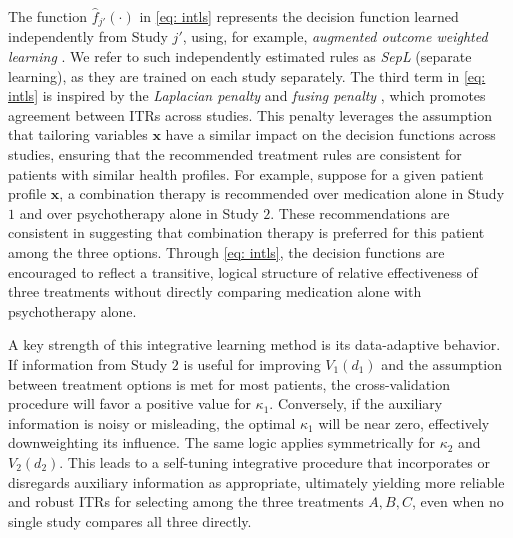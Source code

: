 \documentclass[12pt]{article}
\begin{document}
The function $\widehat{f}_{j'}(\cdot)$ in \eqref{eq: intls} represents the decision function learned independently from Study $j'$, using, for example, {\it augmented outcome weighted learning} \citep{liu2018augmented}. We refer to such independently estimated rules as {\it SepL} (separate learning), as they are trained on each study separately. The third term in \eqref{eq: intls} is inspired by the {\it Laplacian penalty} \citep{huang2011sparse} and {\it fusing penalty} \citep{gao2024fusing}, which promotes agreement between ITRs across studies. This penalty leverages the assumption that tailoring variables $\boldsymbol {x} $ have a similar impact on the decision functions across studies, ensuring that the recommended treatment rules are consistent for patients with similar health profiles. For example, suppose for a given patient profile $\boldsymbol x$, a combination therapy is recommended over medication alone in Study $1$ and over psychotherapy alone in Study $2$. These recommendations are consistent in suggesting that combination therapy is preferred for this patient among the three options. Through \eqref{eq: intls}, the decision functions are encouraged to reflect a transitive, logical structure of relative effectiveness of three treatments without directly comparing medication alone with psychotherapy alone.

A key strength of this integrative learning method is its data-adaptive behavior. If information from Study $2$ is useful for improving $V_1(d_1)$ and the assumption between treatment options is met for most patients, the cross-validation procedure will favor a positive value for $\kappa_1$. Conversely, if the auxiliary information is noisy or misleading, the optimal $\kappa_1$ will be near zero, effectively downweighting its influence. The same logic applies symmetrically for $\kappa_2$ and $V_2(d_2)$. This leads to a self-tuning integrative procedure that incorporates or disregards auxiliary information as appropriate, ultimately yielding more reliable and robust ITRs for selecting among the three treatments $A, B, C$, even when no single study compares all three directly.
\end{document}
